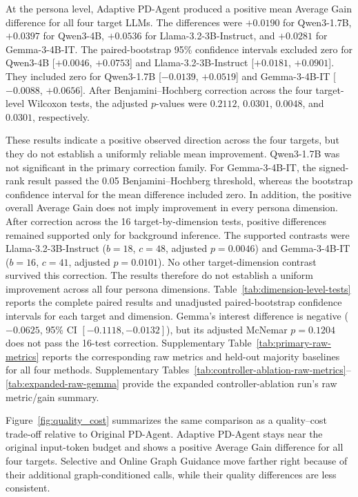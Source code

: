 \documentclass{ieeeaccess}
\begin{document}
At the persona level, Adaptive PD-Agent produced a positive mean Average Gain difference
for all four target LLMs. The differences were $+0.0190$ for Qwen3-1.7B, $+0.0397$ for
Qwen3-4B, $+0.0536$ for Llama-3.2-3B-Instruct, and $+0.0281$ for Gemma-3-4B-IT.
The paired-bootstrap 95\% confidence intervals excluded zero for Qwen3-4B
[$+0.0046$, $+0.0753$] and Llama-3.2-3B-Instruct [$+0.0181$, $+0.0901$]. They included
zero for Qwen3-1.7B [$-0.0139$, $+0.0519$] and Gemma-3-4B-IT [$-0.0088$, $+0.0656$].
After Benjamini--Hochberg correction across the four target-level Wilcoxon tests,
the adjusted $p$-values were $0.2112$, $0.0301$, $0.0048$, and $0.0301$, respectively.

These results indicate a positive observed direction across the four targets, but they do not establish a uniformly reliable mean improvement. Qwen3-1.7B was not significant in the primary correction family. For Gemma-3-4B-IT, the signed-rank result passed the 0.05 Benjamini--Hochberg threshold, whereas the bootstrap confidence interval for the mean difference included zero. In addition, the positive overall Average Gain does not imply improvement in every persona dimension.
After correction across the 16 target-by-dimension tests, positive differences remained
supported only for background inference. The supported contrasts were Llama-3.2-3B-Instruct
($b=18$, $c=48$, adjusted $p=0.0046$) and Gemma-3-4B-IT
($b=16$, $c=41$, adjusted $p=0.0101$). No other target-dimension contrast survived this
correction. The results therefore do not establish a uniform improvement across all four
persona dimensions. Table~\ref{tab:dimension-level-tests} reports the complete paired
results and unadjusted paired-bootstrap confidence intervals for each target and dimension.
Gemma's interest difference is negative ($-0.0625$, 95\% CI $[-0.1118,-0.0132]$),
but its adjusted McNemar $p=0.1204$ does not pass the 16-test correction.
Supplementary Table~\ref{tab:primary-raw-metrics}
reports the corresponding raw metrics and held-out majority baselines for all four methods.
Supplementary Tables~\ref{tab:controller-ablation-raw-metrics}--\ref{tab:expanded-raw-gemma}
provide the expanded controller-ablation run's raw metric/gain summary.

Figure~\ref{fig:quality_cost} summarizes the same comparison as a quality--cost trade-off relative to Original PD-Agent. Adaptive PD-Agent stays near the original input-token budget and shows a positive Average Gain difference for all four targets. Selective and Online Graph Guidance move farther right because of their additional graph-conditioned calls, while their quality differences are less consistent.
\end{document}
